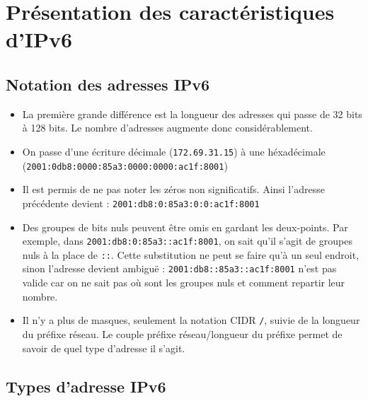 \documentclass[a4paper,11pt,final]{article}
\begin{document}
  \cleardoublepage  
  \section{Présentation des caractéristiques d’IPv6}
  \subsection{Notation des adresses IPv6}
  
\begin{itemize}
\item La première grande différence est la longueur des adresses qui passe de 32 bits à 128 bits. Le nombre d’adresses augmente donc considérablement.
\item On passe d’une écriture décimale (\texttt{172.69.31.15}) à une héxadécimale (\texttt{2001:0db8:0000:85a3:0000:0000:ac1f:8001})
\item Il est permis de ne pas noter les zéros non significatifs. Ainsi l'adresse précédente devient : \texttt{2001:db8:0:85a3:0:0:ac1f:8001}
\item Des groupes de bits nuls peuvent être omis en gardant les deux-points. Par exemple, dans \texttt{2001:db8:0:85a3::ac1f:8001}, on sait qu'il s’agit de groupes nuls à la place de \texttt{::}. Cette substitution ne peut se faire qu’à un seul endroit, sinon l’adresse devient ambiguë : \texttt{2001:db8::85a3::ac1f:8001} n'est pas valide car on ne sait pas où sont les groupes nuls et comment repartir leur nombre.
\item Il n’y a plus de masques, seulement la notation CIDR \texttt{/}, suivie de la longueur du préfixe réseau. Le couple préfixe réseau/longueur du préfixe permet de savoir de quel type d’adresse il s’agit.
\end{itemize}

\subsection{Types d’adresse IPv6}
\end{document}
